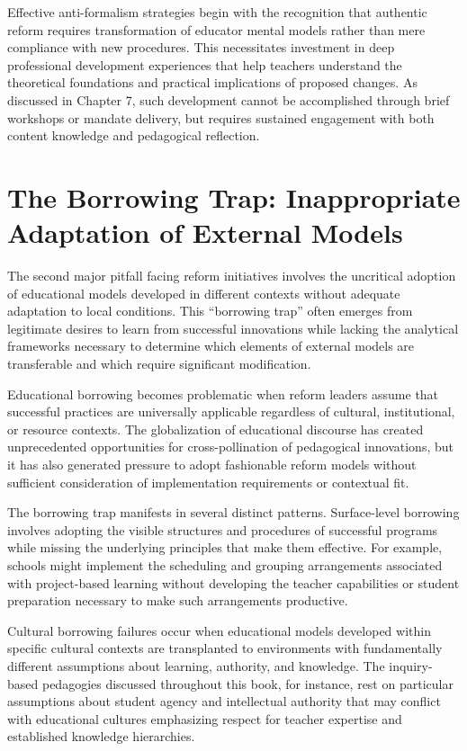 \documentclass[
  Letterpaper,
]{scrbook}
\begin{document}
Effective anti-formalism strategies begin with the recognition that
authentic reform requires transformation of educator mental models
rather than mere compliance with new procedures. This necessitates
investment in deep professional development experiences that help
teachers understand the theoretical foundations and practical
implications of proposed changes. As discussed in Chapter 7, such
development cannot be accomplished through brief workshops or mandate
delivery, but requires sustained engagement with both content knowledge
and pedagogical reflection.

\section{The Borrowing Trap: Inappropriate Adaptation of External
Models}\label{the-borrowing-trap-inappropriate-adaptation-of-external-models}

The second major pitfall facing reform initiatives involves the
uncritical adoption of educational models developed in different
contexts without adequate adaptation to local conditions. This
``borrowing trap'' often emerges from legitimate desires to learn from
successful innovations while lacking the analytical frameworks necessary
to determine which elements of external models are transferable and
which require significant modification.

Educational borrowing becomes problematic when reform leaders assume
that successful practices are universally applicable regardless of
cultural, institutional, or resource contexts. The globalization of
educational discourse has created unprecedented opportunities for
cross-pollination of pedagogical innovations, but it has also generated
pressure to adopt fashionable reform models without sufficient
consideration of implementation requirements or contextual fit.

The borrowing trap manifests in several distinct patterns. Surface-level
borrowing involves adopting the visible structures and procedures of
successful programs while missing the underlying principles that make
them effective. For example, schools might implement the scheduling and
grouping arrangements associated with project-based learning without
developing the teacher capabilities or student preparation necessary to
make such arrangements productive.

Cultural borrowing failures occur when educational models developed
within specific cultural contexts are transplanted to environments with
fundamentally different assumptions about learning, authority, and
knowledge. The inquiry-based pedagogies discussed throughout this book,
for instance, rest on particular assumptions about student agency and
intellectual authority that may conflict with educational cultures
emphasizing respect for teacher expertise and established knowledge
hierarchies.
\end{document}
